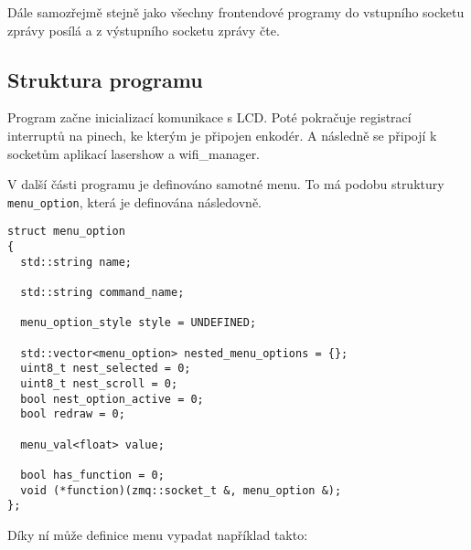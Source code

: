 Dále samozřejmě stejně jako všechny frontendové programy do vstupního socketu zprávy posílá a z výstupního socketu zprávy čte.

\subsection{Struktura programu}
Program začne inicializací komunikace s LCD.
Poté pokračuje registrací interruptů na pinech, ke kterým je připojen enkodér. A následně se připojí k socketům aplikací lasershow a wifi\_manager.

V další části programu je definováno samotné menu. To má podobu struktury \texttt{menu_option}, která je definována následovně.

\begin{verbatim}
struct menu_option
{
  std::string name;

  std::string command_name;

  menu_option_style style = UNDEFINED;

  std::vector<menu_option> nested_menu_options = {};
  uint8_t nest_selected = 0;
  uint8_t nest_scroll = 0;
  bool nest_option_active = 0;
  bool redraw = 0;

  menu_val<float> value;

  bool has_function = 0;
  void (*function)(zmq::socket_t &, menu_option &);
};
\end{verbatim}

Díky ní může definice menu vypadat například takto:

